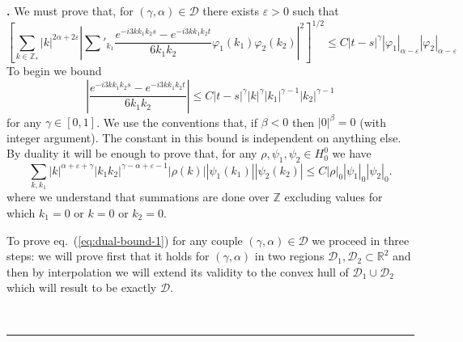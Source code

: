 \documentclass[a4paper,12pt,reqno]{article}
\newcommand{\eps}{\varepsilon}
\newcommand{\RR}{\mathbb{R}}
\newcommand{\DD}{\mathcal{D}}
\newcommand{\ZZ}{\mathbb{Z}}
\newenvironment{proof}[1][Proof]{\textbf{#1.} }{\ \rule{0.5em}{0.5em}}
\begin{document}
\begin{proof}[]
We must prove that, for $(\gamma,\alpha) \in \DD$ there exists $\eps > 0$ such that
$$
\left[
\sum_{k \in \ZZ_*} |k|^{2\alpha+2\eps} \left|\sum'_{k_1} \frac{e^{-i 3 k k_1 k_2
      s}-e^{-i 3 k k_1 k_2 t}}{6 k_1 k_2} \varphi_1(k_1)\varphi_2(k_2)
\right|^2 \right]^{1/2}\le C |t-s|^\gamma |\varphi_1|_{\alpha-\eps} |\varphi_2|_{\alpha-\eps}
$$
To begin we bound
$$
\left| \frac{e^{-i 3 k k_1 k_2
      s}-e^{-i 3 k k_1 k_2 t}}{6 k_1 k_2}\right| \le C |t-s|^\gamma
|k|^\gamma |k_1|^{\gamma-1} |k_2|^{\gamma-1}
$$
for any $\gamma \in[0,1]$.
We use the conventions that, if $\beta < 0$ then  $|0|^\beta =
0$ (with integer argument). The constant in this bound is independent on anything else.
By duality it will be enough to prove that, for any $\rho,\psi_1,\psi_2 \in
H^0_0$ we have
\begin{equation}
  \label{eq:dual-bound-1}
\sum_{k, k_1}  |k|^{\alpha+\eps+\gamma} |k_1 k_2|^{\gamma-\alpha+\eps-1} 
|\rho(k)| |\psi_1(k_1)| |\psi_2(k_2)| \le C |\rho|_0 |\psi_1|_{0} |\psi_2|_{0}.  
\end{equation}
where we understand that summations are done over $\ZZ$ excluding
values for which $k_1 = 0$ or $k = 0$ or $k_2 = 0$.
 
To prove eq.~(\ref{eq:dual-bound-1}) for any couple
$(\gamma,\alpha)\in \DD$ we proceed in three steps: we will
prove first that it holds for $(\gamma,\alpha)$ in two regions
$\DD_1,\DD_2 \subset \RR^2 $ and then by interpolation we will
extend its validity to the convex hull of $\DD_1 \cup
\DD_2$ which will result to be exactly $\DD$. 


\end{proof}
\end{document}
